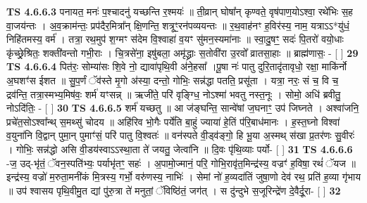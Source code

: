 \documentclass[17pt]{extarticle}
\begin{document}
                  \newline
                                \textbf{ TS 4.6.6.3} \newline
                  पनायत॒ मनः॑ प॒श्चादनु॑ यच्छन्ति र॒श्मयः॑ ॥ ती॒व्रान् घोषा᳚न् कृण्वते॒ वृष॑पाण॒योऽश्वा॒ रथे॑भिः स॒ह वा॒जय॑न्तः । अ॒व॒क्राम॑न्तः॒ प्रप॑दैर॒मित्रा᳚न् क्षि॒णन्ति॒ शत्रूꣳ॒॒रन॑पव्ययन्तः ॥ र॒थ॒वाह॑नꣳ ह॒विर॑स्य॒ नाम॒ यत्राऽऽ*यु॑धं॒ निहि॑तमस्य॒ वर्म॑ । तत्रा॒ रथ॒मुप॑ श॒ग्मꣳ स॑देम वि॒श्वाहा॑ व॒यꣳ सु॑मन॒स्यमा॑नाः ॥ स्वा॒दु॒षꣳ॒॒ सदः॑ पि॒तरो॑ वयो॒धाः कृ॑च्छ्रे॒श्रितः॒ शक्ती॑वन्तो गभी॒राः । चि॒त्रसे॑ना॒ इषु॑बला॒ अमृ॑द्ध्राः स॒तोवी॑रा उ॒रवो᳚ व्रातसा॒हाः ॥ ब्राह्म॑णासः॒ - [  ] \textbf{  29} \newline
                  \newline
                                \textbf{ TS 4.6.6.4} \newline
                  पित॑रः॒ सोम्या॑सः शि॒वे नो॒ द्यावा॑पृथि॒वी अ॑ने॒हसा᳚ ।पू॒षा नः॑ पातु दुरि॒तादृ॑तावृधो॒ रक्षा॒ माकि॑र्नो अ॒घशꣳ॑स ईशत ॥ सु॒प॒र्णं ॅव॑स्ते मृ॒गो अ॑स्या॒ दन्तो॒ गोभिः॒ सन्न॑द्धा पतति॒ प्रसू॑ता । यत्रा॒ नरः॒ सं च॒ वि च॒ द्रव॑न्ति॒ तत्रा॒स्मभ्य॒मिष॑वः॒ शर्म॑ यꣳसन्न् ॥ ऋजी॑ते॒ परि॑ वृङ्ग्धि॒ नोऽश्मा॑ भवतु नस्त॒नूः । सोमो॒ अधि॑ ब्रवीतु॒ नोऽदि॑तिः॒ - [  ] \textbf{  30} \newline
                  \newline
                                \textbf{ TS 4.6.6.5} \newline
                  शर्म॑ यच्छतु ॥ आ ज॑ङ्घन्ति॒ सान्वे॑षां ज॒घनाꣳ॒॒ उप॑ जिघ्नते । अश्वा॑जनि॒ प्रचे॑त॒सोऽश्वा᳚न्थ् स॒मथ्सु॑ चोदय ॥ अहि॑रिव भो॒गैः पर्ये॑ति बा॒हुं ज्याया॑ हे॒तिं प॑रि॒बाध॑मानः । ह॒स्त॒घ्नो विश्वा॑ व॒युना॑नि वि॒द्वान् पुमा॒न् पुमाꣳ॑सं॒ परि॑ पातु वि॒श्वतः॑ ॥ वन॑स्पते वी॒ड्व॑ङ्गो॒ हि भू॒या अ॒स्मथ् स॑खा प्र॒तर॑णः सु॒वीरः॑ । गोभिः॒ सन्न॑द्धो असि वी॒डय॑स्वाऽऽस्था॒ता ते॑ जयतु॒ जेत्वा॑नि ॥ दि॒वः पृ॑थि॒व्याः पर्यो- [  ] \textbf{  31} \newline
                  \newline
                                \textbf{ TS 4.6.6.6} \newline
                  -ज॒ उद्-भृ॑तं॒ ॅवन॒स्पति॑भ्यः॒ पर्याभृ॑तꣳ॒॒ सहः॑ । अ॒पामो॒ज्मानं॒ परि॒ गोभि॒रावृ॑त॒मिन्द्र॑स्य॒ वज्रꣳ॑ ह॒विषा॒ रथं॑ ॅयज ॥ इन्द्र॑स्य॒ वज्रो॑ म॒रुता॒मनी॑कं मि॒त्रस्य॒ गर्भो॒ वरु॑णस्य॒ नाभिः॑ । सेमां नो॑ ह॒व्यदा॑तिं जुषा॒णो देव॑ रथ॒ प्रति॑ ह॒व्या गृ॑भाय ॥ उप॑ श्वासय पृथि॒वीमु॒त द्यां पु॑रु॒त्रा ते॑ मनुतां॒ ॅविष्ठि॑तं॒ जग॑त् । स दु॑न्दुभे स॒जूरिन्द्रे॑ण दे॒वैर्दू॒रा- [  ] \textbf{  32} \newline
                  \newline
\end{document}
